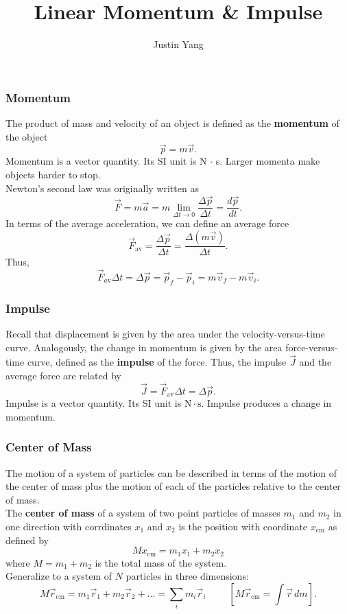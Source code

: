 \documentclass{beamer}
\title{Linear Momentum \& Impulse}
\author{Justin Yang}
\begin{document}
\begin{frame}
\titlepage
\end{frame}

\begin{frame}
\frametitle{Momentum}
The product of mass and velocity of an object is defined as the \textbf{momentum} of the object $$\vec{p} = m \vec{v}.$$
Momentum is a vector quantity. Its SI unit is N $\cdot$ s. Larger momenta make objects harder to stop.
\\Newton's second law was originally written as $$\vec{F} = m \vec{a} = m \lim_{\Delta{t} \to 0}{\frac{\Delta{\vec{p}}}{\Delta{t}}} = \frac{d\vec{p}}{dt}.$$ In terms of the average acceleration, we can define an average force $$\vec{F}_\mathrm{av} = \frac{\Delta{\vec{p}}}{\Delta{t}} = \frac{\Delta{\left(m \vec{v}\right)}}{\Delta{t}}.$$
Thus, $$\vec{F}_{a\mathrm{v}} \Delta{t} = \Delta{\vec{p}} = \vec{p}_f - \vec{p}_i = m \vec{v}_f - m \vec{v}_i.$$
\end{frame}

\begin{frame}
\frametitle{Impulse}
Recall that displacement is given by the area under the velocity-versus-time curve. Analogously, the change in momentum is given by the area force-versus-time curve, defined as the \textbf{impulse} of the force. Thus, the impulse $\vec{J}$ and the average force are related by $$\vec{J} = \vec{F}_\mathrm{av} \Delta{t} = \Delta{\vec{p}}.$$
Impulse is a vector quantity. Its SI unit is $\mathrm{N} \cdot \mathrm{s}$. Impulse produces a change in momentum.
\end{frame}

\begin{frame}
\frametitle{Center of Mass}
The motion of a system of particles can be described in terms of the motion of the center of mass plus the motion of each of the particles relative to the center of mass.
\\The \textbf{center of mass} of a system of two point particles of masses $m_1$ and $m_2$ in one direction with corrdinates $x_1$ and $x_2$ is the position with coordinate $x_\mathrm{cm}$ as defined by $$M x_\mathrm{cm} = m_1 x_1 + m_2 x_2$$ where $M = m_1 + m_2$ is the total mass of the system.
\\Generalize to a system of $N$ particles in three dimensions: $$M \vec{r}_\mathrm{cm} = m_1 \vec{r}_1 + m_2 \vec{r}_2 + \dots = \sum_i m_i \vec{r}_i \hspace{1cm} \left[M \vec{r}_\mathrm{cm} = \int{\vec{r}\,dm}\right].$$
\end{frame}
\end{document}
